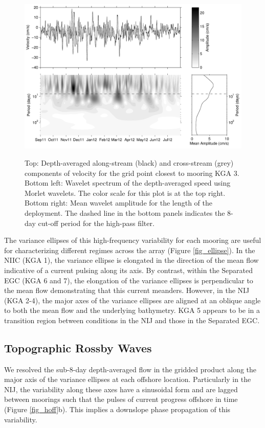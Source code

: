 \documentclass[12pt,titlepage,figuresatend]{article}
\begin{document}
\begin{figure}[ht!]
  \centering\includegraphics[width=\hsize]{./figures/TRWwavelet.pdf}
  \caption{Top: Depth-averaged along-stream (black) and cross-stream (grey) components of velocity for the grid point closest to mooring KGA 3. Bottom left: Wavelet spectrum of the depth-averaged speed using Morlet wavelets. The color scale for this plot is at the top right. Bottom right: Mean wavelet amplitude for the length of the deployment. The dashed line in the bottom panels indicates the 8-day cut-off period for the high-pass filter.}{\label{fig_waveSpec}}
\end{figure}

The variance ellipses of this high-frequency variability for each mooring are useful for characterizing different regimes across the array (Figure \ref{fig_ellipse}). In the NIIC (KGA 1), the variance ellipse is elongated in the direction of the mean flow indicative of a current pulsing along its axis. By contrast, within the Separated EGC (KGA 6 and 7), the elongation of the variance ellipses is perpendicular to the mean flow demonstrating that this current meanders. However, in the NIJ (KGA 2-4), the major axes of the variance ellipses are aligned at an oblique angle to both the mean flow and the underlying bathymetry. KGA 5 appears to be in a transition region between conditions in the NIJ and those in the Separated EGC.


\subsection{Topographic Rossby Waves}
\label{TRWsec}

We resolved the sub-8-day depth-averaged flow in the gridded product along the major axis of the variance ellipses at each offshore location. Particularly in the NIJ, the variability along these axes have a sinusoidal form and are lagged between moorings such that the pulses of current progress offshore in time (Figure \ref{fig_hoff}b). This implies a downslope phase propagation of this variability.
\end{document}
